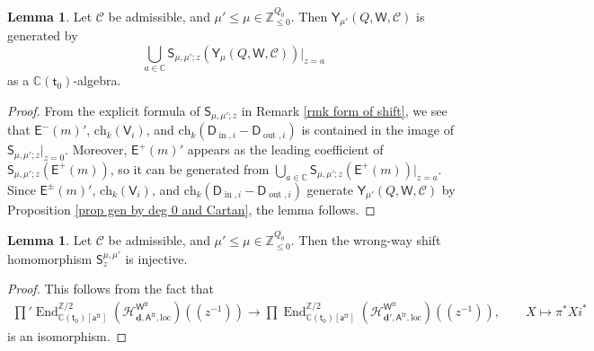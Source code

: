 \documentclass[10pt]{amsart}
\theoremstyle{definition}
\newtheorem{Lemma}[Theorem]{Lemma}
\numberwithin{equation}{section}
\newcommand{\bC}{\mathbb{C}}
\newcommand{\bZ}{\mathbb{Z}}
\newcommand{\bd}{\mathbf{d}}
\newcommand{\cH}{\mathcal{H}}
\newcommand{\sE}{\mathsf{E}}
\newcommand{\sS}{\mathsf{S}}
\newcommand{\sW}{\mathsf{W}}
\newcommand{\End}{\operatorname{End}}
\newcommand{\In}{\operatorname{in}}
\newcommand{\Out}{\operatorname{out}}
\begin{document}
\begin{Lemma}\label{lem shift generation lemma}
Let $\mathcal C$ be admissible, and $\mu'\leqslant \mu\in \bZ_{\leqslant 0}^{Q_0}$. Then $\mathsf Y_{\mu'}(Q,\sW,\mathcal C)$ is generated by $$\bigcup_{a\in \bC}\sS_{\mu,\mu';z}(\mathsf Y_{\mu}(Q,\sW,\mathcal C))\big|_{z=a}$$ as a $\bC(\mathsf t_0)$-algebra.
\end{Lemma}

\begin{proof}
From the explicit formula of $\sS_{\mu,\mu';z}$ in Remark \ref{rmk form of shift}, we see that $\sE^-(m)'$, $\mathrm{ch}_k(\mathsf V_i)$, and $\mathrm{ch}_k(\mathsf D_{\In,i}-\mathsf D_{\Out,i})$ is contained in the image of $\sS_{\mu,\mu';z}\big|_{z=0}$. Moreover, $\sE^+(m)'$ appears as the leading coefficient of $\sS_{\mu,\mu';z}(\sE^+(m))$, so it can be generated from $\bigcup_{a\in \bC}\sS_{\mu,\mu';z}(\sE^+(m))\big|_{z=a}$. Since $\sE^\pm(m)'$, $\mathrm{ch}_k(\mathsf V_i)$, and $\mathrm{ch}_k(\mathsf D_{\In,i}-\mathsf D_{\Out,i})$ generate $\mathsf Y_{\mu'}(Q,\sW,\mathcal C)$ by Proposition \ref{prop gen by deg 0 and Cartan}, the lemma follows.
\end{proof}

\begin{Lemma}\label{lem wrong-way shift inj}
Let $\mathcal C$ be admissible, and $\mu'\leqslant \mu\in \bZ_{\leqslant 0}^{Q_0}$. Then the wrong-way shift homomorphism $\sS^{\mu,\mu'}_z$ is injective.
\end{Lemma}

\begin{proof}
This follows from the fact that
\begin{align*}
    {\prod}'\End^{\bZ/2}_{\bC(\mathsf t_0)[\mathsf a^{\mathrm{fr}}]}(\cH^{\sW^{\mathrm{fr}}}_{\underline{\bd},\mathsf A^{\mathrm{fr}},\mathrm{loc}})(\!(z^{-1})\!)\longrightarrow \prod\End^{\bZ/2}_{\bC(\mathsf t_0)[\mathsf a^{\mathrm{fr}}]}(\cH^{\sW^{\mathrm{fr}}}_{\underline{\bd}',\mathsf A^{\mathrm{fr}},\mathrm{loc}})(\!(z^{-1})\!),\qquad X\mapsto \pi^*Xi^*
\end{align*}
is an isomorphism.
\end{proof}
\end{document}

